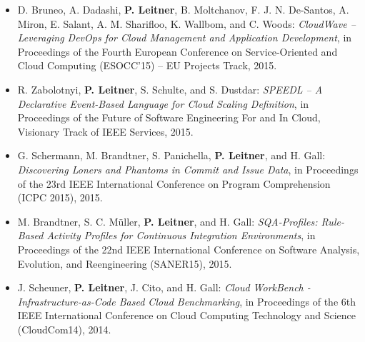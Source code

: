 \documentclass[paper=letter,fontsize=11pt]{scrartcl} %
\begin{document}
\begin{itemize}
  \item  D. Bruneo, A. Dadashi, \textbf{P. Leitner}, B. Moltchanov, F. J. N. De-Santos, A. Miron, E. Salant, A. M. Sharifloo, K. Wallbom, and C. Woods: \emph{CloudWave – Leveraging DevOps for Cloud Management and Application Development}, in Proceedings of the Fourth European Conference on Service-Oriented and Cloud Computing (ESOCC’15) – EU Projects Track, 2015.
      \item R. Zabolotnyi, \textbf{P. Leitner}, S. Schulte, and S. Dustdar: \emph{SPEEDL -- A Declarative Event-Based Language for Cloud Scaling Definition}, in Proceedings of the Future of Software Engineering For and In Cloud, Visionary Track of IEEE Services, 2015.
  \item G. Schermann, M. Brandtner, S. Panichella, \textbf{P. Leitner}, and H. Gall: \emph{Discovering Loners and Phantoms in Commit and Issue Data}, in Proceedings of the 23rd IEEE International Conference
on Program Comprehension (ICPC 2015), 2015.
  \item M. Brandtner, S. C. M\"uller, \textbf{P. Leitner}, and H. Gall: \emph{SQA-Profiles: Rule-Based Activity Profiles for Continuous Integration Environments}, in Proceedings of the 22nd IEEE International Conference on Software Analysis, Evolution, and Reengineering (SANER15), 2015.
  \item J. Scheuner, \textbf{P. Leitner}, J. Cito, and H. Gall: \emph{Cloud WorkBench - Infrastructure-as-Code Based Cloud Benchmarking}, in Proceedings of the 6th IEEE International Conference on Cloud Computing Technology and Science (CloudCom14), 2014.

\end{itemize}
\end{document}
